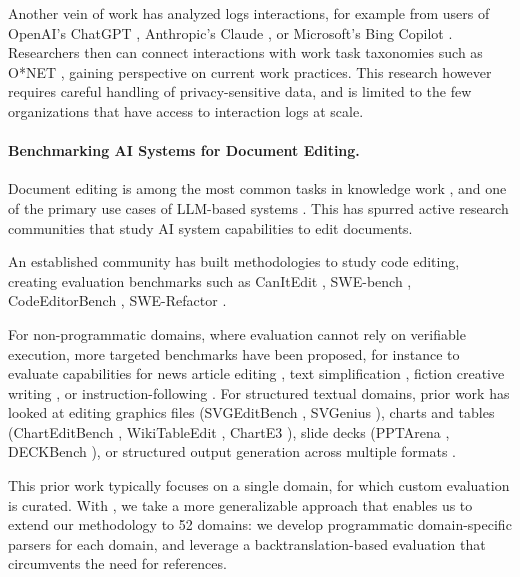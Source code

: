 \documentclass{article} %
\begin{document}
Another vein of work has analyzed logs interactions, for example from users of OpenAI's ChatGPT \cite{Chatterji2025HowPU}, Anthropic's Claude \cite{Handa2025WhichET}, or Microsoft's Bing Copilot \cite{Tomlinson2025WorkingWA}. Researchers then can connect interactions with work task taxonomies such as O*NET \cite{Peterson2001UNDERSTANDINGWU}, gaining perspective on current work practices. This research however requires careful handling of privacy-sensitive data, and is limited to the few organizations that have access to interaction logs at scale.

\paragraph{Benchmarking AI Systems for Document Editing.}

Document editing is among the most common tasks in knowledge work \cite{Siu2025AugmentingEC}, and one of the primary use cases of LLM-based systems \cite{Handa2025WhichET,Eloundou2023GPTsAG}. This has spurred active research communities that study AI system capabilities to edit documents.

An established community has built methodologies to study code editing, creating evaluation benchmarks such as CanItEdit \cite{Cassano2023CanIE}, SWE-bench \cite{Jimenez2023SWEbenchCL}, CodeEditorBench \cite{Guo2024CodeEditorBenchEC}, SWE-Refactor \cite{Xu2026SWERefactorAR}.

For non-programmatic domains, where evaluation cannot rely on verifiable execution, more targeted benchmarks have been proposed, for instance to evaluate capabilities for news article editing \cite{Spangher2022NewsEditsAN}, text simplification \cite{Laban2023SWiPEAD}, fiction creative writing \cite{Chakrabarty2024CanAW}, or instruction-following \cite{Raheja2023CoEdITTE,Dwivedi-Yu2022EditEvalAI}. For structured textual domains, prior work has looked at editing graphics files (SVGEditBench \cite{Nishina2024SVGEditBenchAB}, SVGenius \cite{Chen2025SVGeniusBL}), charts and tables (ChartEditBench \cite{Kapadnis2026ChartEditBenchEG}, WikiTableEdit \cite{Li2024WikiTableEditAB}, ChartE3 \cite{Li2026ChartE3AC}), slide decks (PPTArena \cite{Ofengenden2025PPTArenaAB}, DECKBench \cite{Jang2026DECKBenchBM}), or structured output generation across multiple formats \cite{Yang2025StructEvalBL}.

This prior work typically focuses on a single domain, for which custom evaluation is curated. With \benchmark{}, we take a more generalizable approach that enables us to extend our methodology to 52 domains: we develop programmatic domain-specific parsers for each domain, and leverage a backtranslation-based evaluation that circumvents the need for references.
\end{document}
